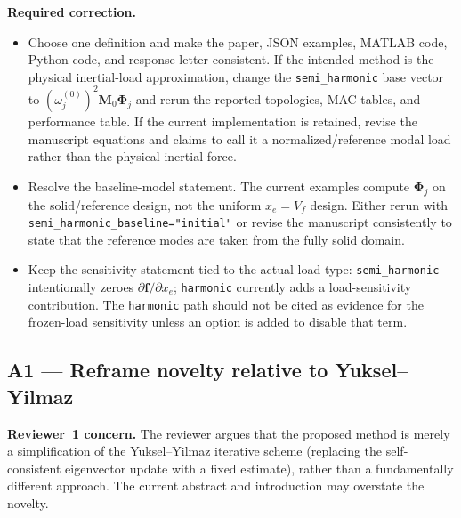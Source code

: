 \documentclass[12pt,a4paper]{article}
\begin{document}
\textbf{Required correction.}
\begin{itemize}[leftmargin=1.6em]
  \item Choose one definition and make the paper, JSON examples, MATLAB code,
        Python code, and response letter consistent.  If the intended method
        is the physical inertial-load approximation, change the
        \texttt{semi\_harmonic} base vector to
        $(\omega_j^{(0)})^2\mathbf{M}_0\boldsymbol{\Phi}_j$ and rerun the
        reported topologies, MAC tables, and performance table.  If the
        current implementation is retained, revise the manuscript equations
        and claims to call it a normalized/reference modal load rather than
        the physical inertial force.
  \item Resolve the baseline-model statement.  The current examples compute
        $\boldsymbol{\Phi}_j$ on the solid/reference design, not the uniform
        $x_e=V_f$ design.  Either rerun with
        \texttt{semi\_harmonic\_baseline="initial"} or revise the manuscript
        consistently to state that the reference modes are taken from the
        fully solid domain.
  \item Keep the sensitivity statement tied to the actual load type:
        \texttt{semi\_harmonic} intentionally zeroes
        $\partial\mathbf{f}/\partial x_e$; \texttt{harmonic} currently adds a
        load-sensitivity contribution.  The \texttt{harmonic} path should not
        be cited as evidence for the frozen-load sensitivity unless an option
        is added to disable that term.
\end{itemize}

\subsection{A1 — Reframe novelty relative to Yuksel--Yilmaz}

\textbf{Reviewer~1 concern.}  The reviewer argues that the proposed method is
merely a simplification of the Yuksel--Yilmaz iterative scheme (replacing the
self-consistent eigenvector update with a fixed estimate), rather than a
fundamentally different approach. The current abstract and introduction may
overstate the novelty.
\end{document}
